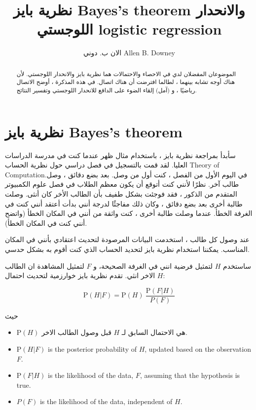 \documentclass[12pt]{article}
\title{نظرية بايز Bayes's theorem والانحدار اللوجستي logistic regression}
\author{ الان ب. دوني Allen B. Downey}
\renewcommand{\P}{\mathrm{P}}
\begin{document}
\maketitle

\begin{abstract}
الموضوعان المفضلان لدي في الاحصاء والاحتمالات هما
نظرية بايز والانحدار اللوجستي. لأن هناك
أوجه تشابه بينهما ، لطالما افترضت أن هناك
اتصال. في هذه المذكرة ، أوضح
الاتصال رياضيًا ، و (آمل) إلقاء الضوء على
الدافع للانحدار اللوجستي وتفسير
النتائج.
\end{abstract}


\section{نظرية بايز Bayes's theorem}

سأبدأ بمراجعة نظرية بايز ، باستخدام مثال ظهر عندما كنت في مدرسة الدراسات العليا. لقد قمت بالتسجيل في فصل دراسي حول نظرية
الحساب Theory of
Computation.في اليوم الأول من الفصل ، كنت أول من وصل. بعد بضع دقائق ، وصل طالب آخر. نظرًا لأنني كنت أتوقع أن يكون معظم الطلاب في فصل علوم الكمبيوتر المتقدم من الذكور ، فقد فوجئت بشكل طفيف بأن الطالب الأخر كان أنثى. وصلت طالبة أخرى بعد بضع دقائق ، وكان ذلك مفاجئًا لدرجة أنني بدأت أعتقد أنني كنت في الغرفة الخطأ. عندما وصلت طالبة أخرى ، كنت واثقة من أنني في المكان الخطأ (واتضح أنني كنت في المكان الخطأ).

عند وصول كل طالب ، استخدمت البيانات المرصودة لتحديث اعتقادي بأنني في المكان المناسب. يمكننا استخدام نظرية بايز لتحديد الحساب الذي كنت أقوم به بشكل حدسي.

ساستخدم $H$ لتمثيل فرضية انني في الغرفة الصحيحة،
و $F$ لتمثيل المشاهدة ان الطالب الاخر انثي. تقدم نظرية بايز خوارزمية لتحديث احتمال $H$:

\[ \P(H|F) = \P(H)~\frac{\P(F|H)}{P(F)}\]

حيث

\begin{itemize}

\item $\P(H)$ هي الاحتمال السابق لـ $H$ قبل وصول الطالب الاخر.

\item $\P(H|F)$ is the posterior probability of $H$, updated based
on the observation $F$.

\item $\P(F|H)$ is the likelihood of the data, $F$, assuming that
the hypothesis is true.

\item $P(F)$ is the likelihood of the data, independent of $H$.
 
\end{itemize}
\end{document}
